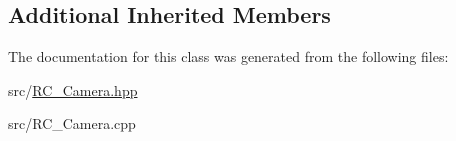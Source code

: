 \subsection*{Additional Inherited Members}


The documentation for this class was generated from the following files\+:\begin{DoxyCompactItemize}
\item 
src/\hyperlink{RC__Camera_8hpp}{R\+C\+\_\+\+Camera.\+hpp}\item 
src/R\+C\+\_\+\+Camera.\+cpp\end{DoxyCompactItemize}
